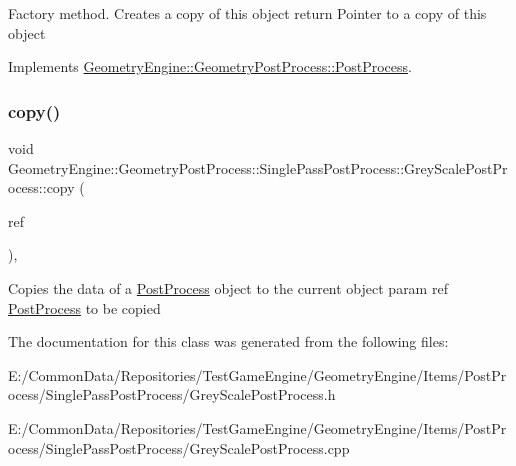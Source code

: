 Factory method. Creates a copy of this object return Pointer to a copy of this object 

Implements \mbox{\hyperlink{class_geometry_engine_1_1_geometry_post_process_1_1_post_process_aa80749cf09041335f6b3bda3aaf31711}{Geometry\+Engine\+::\+Geometry\+Post\+Process\+::\+Post\+Process}}.

\mbox{\label{class_geometry_engine_1_1_geometry_post_process_1_1_single_pass_post_process_1_1_grey_scale_post_process_ae22e2bf8dc5b553a7b1526b695c8be88}} 
\subsubsection{\texorpdfstring{copy()}{copy()}}
{\footnotesize\ttfamily void Geometry\+Engine\+::\+Geometry\+Post\+Process\+::\+Single\+Pass\+Post\+Process\+::\+Grey\+Scale\+Post\+Process\+::copy (\begin{DoxyParamCaption}\item[{const \mbox{\hyperlink{class_geometry_engine_1_1_geometry_post_process_1_1_single_pass_post_process_1_1_grey_scale_post_process}{Grey\+Scale\+Post\+Process}} \&}]{ref }\end{DoxyParamCaption})\hspace{0.3cm}{\ttfamily [protected]}, {\ttfamily [virtual]}}

Copies the data of a \mbox{\hyperlink{class_geometry_engine_1_1_geometry_post_process_1_1_post_process}{Post\+Process}} object to the current object param ref \mbox{\hyperlink{class_geometry_engine_1_1_geometry_post_process_1_1_post_process}{Post\+Process}} to be copied 

The documentation for this class was generated from the following files\+:\begin{DoxyCompactItemize}
\item 
E\+:/\+Common\+Data/\+Repositories/\+Test\+Game\+Engine/\+Geometry\+Engine/\+Items/\+Post\+Process/\+Single\+Pass\+Post\+Process/Grey\+Scale\+Post\+Process.\+h\item 
E\+:/\+Common\+Data/\+Repositories/\+Test\+Game\+Engine/\+Geometry\+Engine/\+Items/\+Post\+Process/\+Single\+Pass\+Post\+Process/Grey\+Scale\+Post\+Process.\+cpp\end{DoxyCompactItemize}
